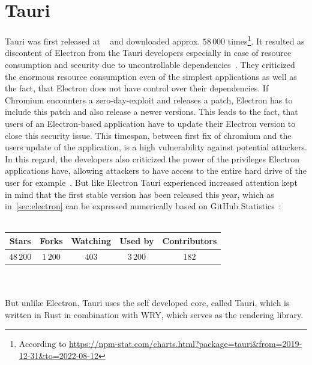 \section{Tauri}
\label{sec:tauri}
Tauri was first released at ~\cite{tauriRelease} and downloaded approx. $58\,000$ times\footnote{According to \url{https://npm-stat.com/charts.html?package=tauri&from=2019-12-31&to=2022-08-12}}.
It resulted as discontent of Electron from the Tauri developers especially in case of resource consumption and security due to uncontrollable dependencies~\cite{tauri}.
They criticized the enormous resource consumption even of the simplest applications as well as the fact, that Electron does not have control over their dependencies.
If Chromium encounters a zero-day-exploit and releases a patch, Electron has to include this patch and also release a newer versions.
This leads to the fact, that users of an Electron-based application have to update their Electron version to close this security issue.
This timespan, between first fix of chromium and the users update of the application, is a high vulnerability against potential attackers.
In this regard, the developers also criticized the power of the privileges Electron applications have, allowing attackers to have access to the entire hard drive of the user for example~\cite{tauri}.
But like Electron Tauri experienced increased attention kept in mind that the first stable version has been released this year, which as in~\ref{sec:electron} can be expressed numerically based on GitHub Statistics~\cite{GithubTauri}: \\ \\
\begin{tabular} {| c | c | c | c | c |}
    \label{tab:tauri:statistics}
    Stars      & Forks     & Watching & Used by    & Contributors \\ \hline
    $48\,200$ & $1\,200$ & $403$ & $3\,200$ & $182$
\end{tabular} \\ \\
But unlike Electron, Tauri uses the self developed core, called Tauri, which is written in Rust in combination with WRY, which serves as the rendering library.


